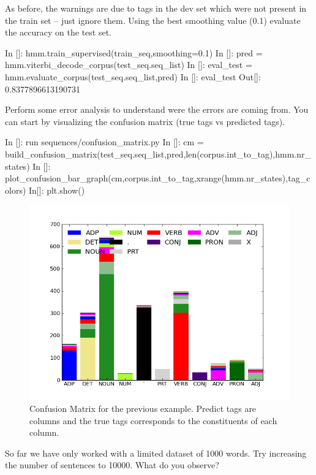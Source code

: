 \begin{exercise}
As before, the warnings are due to tags in the dev set which were not present in the train set -- just ignore them. Using the best smoothing value (0.1) evaluate the accuracy on the test set.

\begin{python}
In []: hmm.train_supervised(train_seq,smoothing=0.1)
In []: pred = hmm.viterbi_decode_corpus(test_seq.seq_list)
In []: eval_test = hmm.evaluate_corpus(test_seq.seq_list,pred)
In []: eval_test
Out[]: 0.8377896613190731
\end{python}

Perform some error analysis to understand were the errors are coming
from. You can start by visualizing the confusion matrix (true tags vs
predicted tags).

\begin{python}
In []: run sequences/confusion_matrix.py
In []: cm = build_confusion_matrix(test_seq.seq_list,pred,len(corpus.int_to_tag),hmm.nr_states)
In []: plot_confusion_bar_graph(cm,corpus.int_to_tag,xrange(hmm.nr_states),tag_colors)
In[]: plt.show()
\end{python}

\begin{figure}
\centering
\includegraphics[scale=.5]{figs/sequences/cm_sup.png}
\caption{\label{fig:cm_uns} Confusion Matrix for the previous
  example. Predict tags are columns and the true tags corresponds to
  the constituents of each column.}
\end{figure}

\end{exercise}


%
%

\begin{exercise}
So far we have only worked with a limited dataset of 1000 words. Try increasing the number of sentences to 10000. What do you observe?

\end{exercise}
